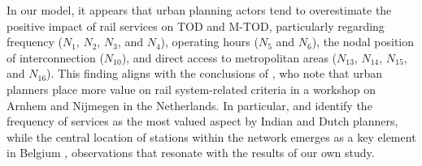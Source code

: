 \begin{refsegment}
In our model, it appears that urban planning actors tend to overestimate the positive impact of rail services on \acrshort{TOD} and \acrshort{M-TOD}, particularly regarding frequency (\(N_{1}\), \(N_{2}\), \(N_{3}\), and \(N_{4}\)), operating hours (\(N_{5}\) and \(N_{6}\)), the nodal position of interconnection (\(N_{10}\)), and direct access to metropolitan areas (\(N_{13}\), \(N_{14}\), \(N_{15}\), and \(N_{16}\)). This finding aligns with the conclusions of \textcolor{blue}{\textcite[41]{lukman_development_2014}}, who note that urban planners place more value on rail system-related criteria in a workshop on Arnhem and Nijmegen in the Netherlands. In particular, \textcolor{blue}{\textcite[2430]{kumar_developing_2020}} and \textcolor{blue}{\textcite[42]{lukman_development_2014}} identify the frequency of services as the most valued aspect by Indian and Dutch planners, while the central location of stations within the network emerges as a key element in Belgium \textcolor{blue}{\autocite[95]{caset_planning_2019}}, observations that resonate with the results of our own study.%


\end{refsegment}
